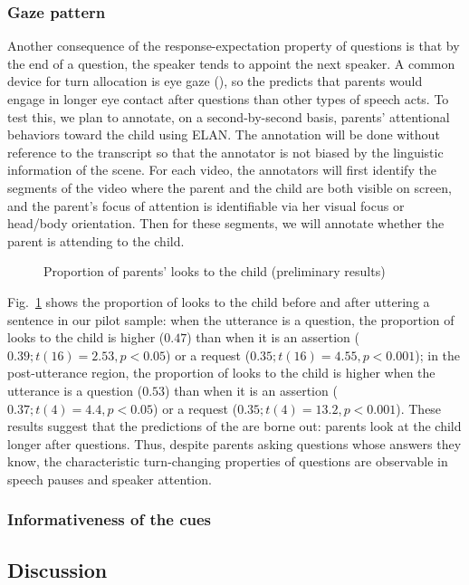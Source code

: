 \subsubsection{Gaze pattern}
\label{sec:engsp:results:gaze}



Another consequence of the response-expectation property of questions is that by the end of a question, the speaker tends to appoint the next speaker. A common device for turn allocation is eye gaze (\citealt{argyle1972gaze, kendon1967gaze,duncan1979gaze, rossano2009gaze}), so the \hypos{} predicts that parents would engage in longer eye contact after questions than other types of speech acts. To test this, we plan to annotate, on a second-by-second basis, parents' attentional behaviors toward the child using ELAN. The annotation will be done without reference to the transcript so that the annotator is not biased by the linguistic information of the scene. For each video, the annotators will first identify the segments of the video where the parent and the child are both visible on screen, and the parent’s focus of attention is identifiable via her visual focus or head/body orientation. Then for these segments, we will annotate whether the parent is attending to the child.  


\begin{figure}[H]
\label{fg:attention}
\begin{center}
	\caption{Proportion of parents' looks to the child (preliminary results)}
\end{center}
\end{figure}


Fig.~\ref{fg:attention} shows the proportion of looks to the child before and after uttering a sentence in our pilot sample: when the utterance is a question, the proportion of looks to the child is higher ($0.47$) than when it is an assertion ($0.39; t(16) = 2.53, p <0.05$) or a request ($0.35; t(16)= 4.55, p<0.001$); in the post-utterance region, the proportion of looks to the child is higher when the utterance is a question ($0.53$) than when it is an assertion ($0.37; t(4) = 4.4, p<0.05$) or a request ($0.35; t(4) = 13.2, p<0.001$). These results suggest that the predictions of the \hypos{} are borne out: parents look at the child longer after questions. Thus, despite parents asking questions whose answers they know, the characteristic turn-changing properties of questions are observable in speech pauses and speaker attention. 


\subsubsection{Informativeness of the cues}
\label{sec:engsp:results:stats}

\subsection{Discussion}
\label{sec:engsp:discussion}

